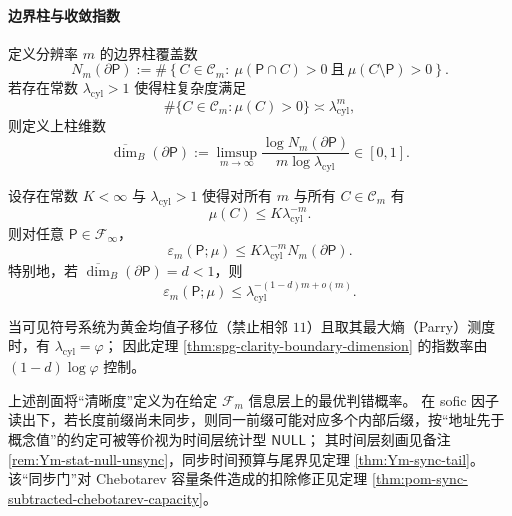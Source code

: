 \paragraph{边界柱与收敛指数}
\begin{definition}\label{def:spg-boundary-cylinder-dimension}
定义分辨率 $m$ 的边界柱覆盖数
\[
N_m(\partial\mathsf P)
:=\#\left\{C\in\mathcal{C}_m:\ \mu(\mathsf P\cap C)>0\ \text{且}\ \mu(C\setminus \mathsf P)>0\right\}.
\]
若存在常数 $\lambda_{\mathrm{cyl}}>1$ 使得柱复杂度满足
\[
\#\{C\in\mathcal{C}_m:\mu(C)>0\}\asymp \lambda_{\mathrm{cyl}}^m,
\]
则定义上柱维数
\[
\overline{\dim}_B(\partial\mathsf P)
:=\limsup_{m\to\infty}\frac{\log N_m(\partial\mathsf P)}{m\log\lambda_{\mathrm{cyl}}}\in[0,1].
\]
\end{definition}

\begin{theorem}[边界维数控制的清晰度收敛]\label{thm:spg-clarity-boundary-dimension}
设存在常数 $K<\infty$ 与 $\lambda_{\mathrm{cyl}}>1$ 使得对所有 $m$ 与所有 $C\in\mathcal{C}_m$ 有
\[
\mu(C)\le K\lambda_{\mathrm{cyl}}^{-m}.
\]
则对任意 $\mathsf P\in\mathcal{F}_\infty$，
\[
\varepsilon_m(\mathsf P;\mu)\le K\lambda_{\mathrm{cyl}}^{-m}N_m(\partial\mathsf P).
\]
特别地，若 $\overline{\dim}_B(\partial\mathsf P)=d<1$，则
\[
\varepsilon_m(\mathsf P;\mu)\le \lambda_{\mathrm{cyl}}^{-(1-d)m+o(m)}.
\]
\end{theorem}

\begin{remark}[黄金均值稳定语法的专门化]\label{rem:spg-golden-mean-specialization}
当可见符号系统为黄金均值子移位（禁止相邻 $11$）且取其最大熵（Parry）测度时，有 $\lambda_{\mathrm{cyl}}=\varphi$；
因此定理 \ref{thm:spg-clarity-boundary-dimension} 的指数率由 $(1-d)\log\varphi$ 控制。
\end{remark}

\begin{remark}[与同步门与空值语义的接口]\label{rem:spg-sync-null-interface}
上述剖面将“清晰度”定义为在给定 $\mathcal{F}_m$ 信息层上的最优判错概率。
在 sofic 因子读出下，若长度前缀尚未同步，则同一前缀可能对应多个内部后缀，按“地址先于概念值”的约定可被等价视为时间层统计型 $\mathsf{NULL}$；
其时间层刻画见备注 \ref{rem:Ym-stat-null-unsync}，同步时间预算与尾界见定理 \ref{thm:Ym-sync-tail}。
该“同步门”对 Chebotarev 容量条件造成的扣除修正见定理 \ref{thm:pom-sync-subtracted-chebotarev-capacity}。
\end{remark}

